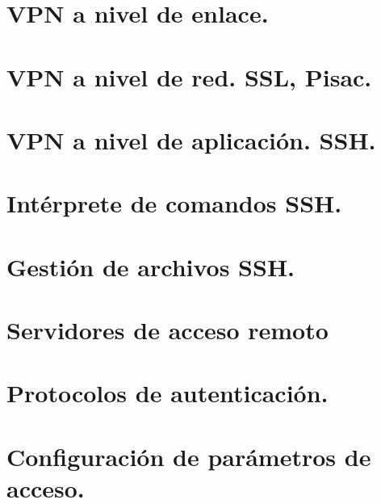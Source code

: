 \documentclass[letterpaper,10pt,spanish]{sphinxmanual}
\begin{document}
\section{VPN a nivel de enlace.}
\label{\detokenize{tema_acceso_remoto/tema_acceso_remoto:vpn-a-nivel-de-enlace}}

\section{VPN a nivel de red. SSL, Pisac.}
\label{\detokenize{tema_acceso_remoto/tema_acceso_remoto:vpn-a-nivel-de-red-ssl-pisac}}

\section{VPN a nivel de aplicación. SSH.}
\label{\detokenize{tema_acceso_remoto/tema_acceso_remoto:vpn-a-nivel-de-aplicacion-ssh}}

\section{Intérprete de comandos SSH.}
\label{\detokenize{tema_acceso_remoto/tema_acceso_remoto:interprete-de-comandos-ssh}}

\section{Gestión de archivos SSH.}
\label{\detokenize{tema_acceso_remoto/tema_acceso_remoto:gestion-de-archivos-ssh}}

\section{Servidores de acceso remoto}
\label{\detokenize{tema_acceso_remoto/tema_acceso_remoto:servidores-de-acceso-remoto}}

\section{Protocolos de autenticación.}
\label{\detokenize{tema_acceso_remoto/tema_acceso_remoto:protocolos-de-autenticacion}}

\section{Configuración de parámetros de acceso.}
\label{\detokenize{tema_acceso_remoto/tema_acceso_remoto:configuracion-de-parametros-de-acceso}}
\end{document}
